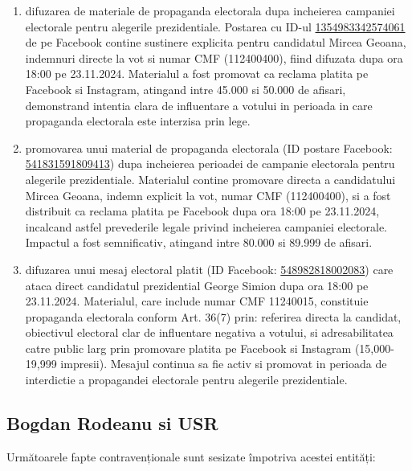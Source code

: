 \documentclass[a4paper,12pt]{article}
\begin{document}
\begin{enumerate}[leftmargin=*, label=\arabic*.)]
    \item difuzarea de materiale de propaganda electorala dupa incheierea campaniei electorale pentru alegerile prezidentiale. Postarea cu ID-ul \href{https://www.facebook.com/ads/library/?id=1354983342574061}{1354983342574061} de pe Facebook contine sustinere explicita pentru candidatul Mircea Geoana, indemnuri directe la vot si numar CMF (112400400), fiind difuzata dupa ora 18:00 pe 23.11.2024. Materialul a fost promovat ca reclama platita pe Facebook si Instagram, atingand intre 45.000 si 50.000 de afisari, demonstrand intentia clara de influentare a votului in perioada in care propaganda electorala este interzisa prin lege.
    \item promovarea unui material de propaganda electorala (ID postare Facebook: \href{https://www.facebook.com/ads/library/?id=541831591809413}{541831591809413}) dupa incheierea perioadei de campanie electorala pentru alegerile prezidentiale. Materialul contine promovare directa a candidatului Mircea Geoana, indemn explicit la vot, numar CMF (112400400), si a fost distribuit ca reclama platita pe Facebook dupa ora 18:00 pe 23.11.2024, incalcand astfel prevederile legale privind incheierea campaniei electorale. Impactul a fost semnificativ, atingand intre 80.000 si 89.999 de afisari.
    \item difuzarea unui mesaj electoral platit (ID Facebook: \href{https://www.facebook.com/ads/library/?id=548982818002083}{548982818002083}) care ataca direct candidatul prezidential George Simion dupa ora 18:00 pe 23.11.2024. Materialul, care include numar CMF 11240015, constituie propaganda electorala conform Art. 36(7) prin: referirea directa la candidat, obiectivul electoral clar de influentare negativa a votului, si adresabilitatea catre public larg prin promovare platita pe Facebook si Instagram (15,000-19,999 impresii). Mesajul continua sa fie activ si promovat in perioada de interdictie a propagandei electorale pentru alegerile prezidentiale.
\end{enumerate}

\vspace{0.5cm}

\subsection{Bogdan Rodeanu si USR}
Următoarele fapte contravenționale sunt sesizate împotriva acestei entități:
\end{document}
